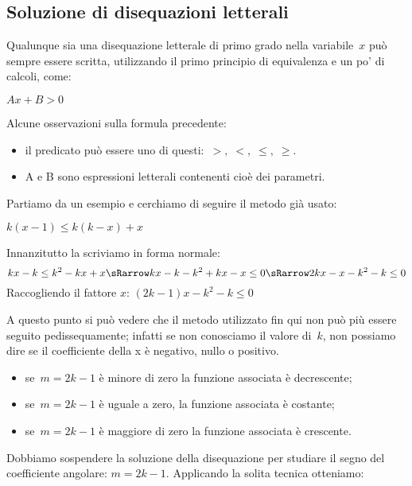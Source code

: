 \subsection{Soluzione di disequazioni letterali}
\label{sec:dis_tetterali}

Qualunque sia una disequazione letterale di primo grado nella variabile~\(x\) 
può sempre essere scritta, utilizzando il primo principio di equivalenza e un 
po' di calcoli, come:

\(A x + B > 0\)

Alcune osservazioni sulla formula precedente:

\begin{itemize} [noitemsep]
 \item il predicato può essere uno di questi:~\(>, \; <, \; \le, \; \ge\).
 \item A e B sono espressioni letterali contenenti cioè dei parametri.
\end{itemize}

Partiamo da un  esempio e cerchiamo di seguire il metodo già usato:

\(k \left( x -1 \right )\le k \left ( k - x \right ) + x\)

Innanzitutto la scriviamo in forma normale:
\[k x - k \le k^2 - k x + x \sRarrow k x - k - k^2 + k x - x \le 0 \sRarrow
2 k x - x - k^2 - k \le 0 \]
Raccogliendo il fattore \(x\): \quad 
\(\left (2 k - 1 \right ) x - k^2 - k \le 0\)

A questo punto si può vedere che il metodo utilizzato fin qui non può più 
essere seguito pedissequamente; infatti se non conosciamo il valore di~\(k\),
non possiamo dire se il coefficiente della x è negativo, nullo o positivo.

\begin{itemize} [noitemsep]
 \item se~\(m = 2k -1\) è minore di zero la funzione associata è decrescente;
 \item se~\(m = 2k -1\) è uguale a zero, la funzione associata è costante;
 \item se~\(m = 2k -1\) è maggiore di zero la funzione associata è crescente.
\end{itemize}


Dobbiamo sospendere la soluzione della disequazione per studiare il segno del 
coefficiente angolare: \(m = 2k -1\). 
Applicando la solita tecnica otteniamo:

